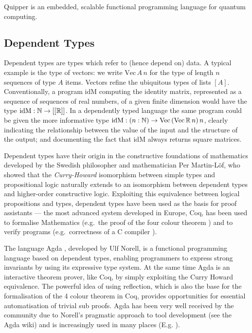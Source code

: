 \documentclass[a4paper]{article}
\begin{document}
Quipper  is an embedded, scalable
functional programming language for quantum computing.

\subsection*{Dependent Types}
Dependent types are types which refer to (hence depend on)
data. A typical example is the type of vectors: we write
$\mathrm{Vec}\,A\,n$ for the type of length $n$ sequences of type $A$
items. Vectors refine the ubiquitous types of lists $[A]$.
Conventionally, a program $\mathrm{idM}$ computing the identity
matrix, represented as a sequence of sequences of real numbers, of a
given finite dimension would have the type $\mathrm{idM} : \Bbb{N} \to
[[\Bbb{R}]]$. In a dependently typed language the same program could
be given the more informative type $\mathrm{idM} : (n:\Bbb{N}) \to
\mathrm{Vec}\,(\mathrm{Vec}\,\Bbb{R}\,n)\,n$, clearly indicating the
relationship between the value of the input and the structure of the
output; and documenting the fact that $\mathrm{idM}$ always returns
square matrices.

Dependent types have their origin in the constructive foundations of
mathematics developed by the Swedish
philosopher and mathematician Per Martin-L\"of, who showed that the
\emph{Curry-Howard} isomorphism between simple types and propositional
logic naturally extends to an isomorphism between dependent types and
higher-order constructive logic.  Exploiting this equivalence between
logical propositions and types, dependent types have been used as the
basis for proof assistants --- the most advanced system developed in
Europe, Coq, has been used to formalise Mathematics (e.g.\
the proof of the four colour theorem
) and to verify programs (e.g.\
correctness of a C
compiler \citemain{compcert-back}).

The language Agda , developed by Ulf Norell, is a functional
programming language based on dependent types, enabling programmers to
express strong invariants by using its expressive type system. At the
same time Agda is an interactive theorem prover, like Coq, by simply
exploiting the Curry Howard equivalence. The powerful idea of using
reflection, which is also the base for the formalisation of the 4
colour theorem in Coq, provides opportunities for essential
automatisation of trivial sub proofs. Agda has been very well received
by the community due to Norell's pragmatic approach to tool
development (see the Agda wiki)
and is increasingly used in many places 
(E.g. \citemain{agda4}).
\end{document}
